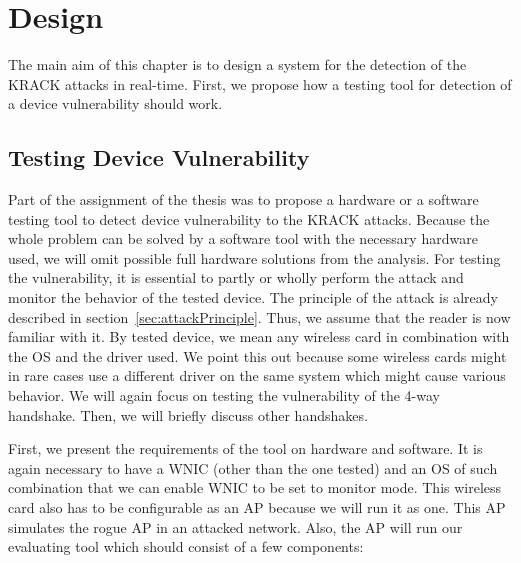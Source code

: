 \chapter{Design}
\label{chap:design}

The main aim of this chapter is to design a system for the detection of the KRACK attacks in real-time. First, we propose how a testing tool for detection of a device vulnerability should work. 

\section{Testing Device Vulnerability}
\label{sec:testingTool}

Part of the assignment of the thesis was to propose a hardware or a software testing tool to detect device vulnerability to the KRACK attacks. Because the whole problem can be solved by a software tool with the necessary hardware used, we will omit possible full hardware solutions from the analysis. For testing the vulnerability, it is essential to partly or wholly perform the attack and monitor the behavior of the tested device. The principle of the attack is already described in section~\ref{sec:attackPrinciple}. Thus, we assume that the reader is now familiar with it. By tested device, we mean any wireless card in combination with the OS and the driver used. We point this out because some wireless cards might in rare cases use a different driver on the same system which might cause various behavior. We will again focus on testing the vulnerability of the 4-way handshake. Then, we will briefly discuss other handshakes.

First, we present the requirements of the tool on hardware and software. It is again necessary to have a WNIC (other than the one tested) and an OS of such combination that we can enable WNIC to be set to monitor mode. This wireless card also has to be configurable as an AP because we will run it as one. This AP simulates the rogue AP in an attacked network. Also, the AP will run our evaluating tool which should consist of a few components:


